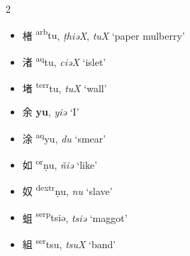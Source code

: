 \begin{multicols}{2}
\begin{minipage}{\columnwidth}
\begin{itemize}[leftmargin=*, labelsep=0.5em]
    \item {\Large{楮}} %
    {\large{{\textsuperscript{arb}tu}}},
    \textit{ṭhiəX}, \textit{tuX} %
    `paper mulberry'

    \item {\Large{渚}} %
    {\large{{\textsuperscript{aq}tu}}},
    \textit{ciəX} %
    `islet'

    \item {\Large{堵}} %
    {\large{{\textsuperscript{terr}tu}}},
    \textit{tuX} %
    `wall'
\end{itemize}
\end{minipage}

\medskip

\begin{itemize}
    \item {\Large{余}} %
    {\large{\textbf{yu}}},
    \textit{yiə} %
    `I'

    \item {\Large{涂}} %
    {\large{{\textsuperscript{aq}yu}}},
    \textit{du} %
    `smear'
\end{itemize}

\vspace{4mm}

\begin{minipage}{\columnwidth}
\begin{itemize}[leftmargin=*, labelsep=0.5em]
    \item {\Large{如}} %
    {\large{{\textsuperscript{or}ṇu}}},
    \textit{ñiə} %
    `like'

    \item {\Large{奴}} %
    {\large{{\textsuperscript{dextr}ṇu}}},
    \textit{nu} %
    `slave'
\end{itemize}
\end{minipage}


\medskip

\begin{itemize}
    \item {\Large{蛆}} %
    {\large{{\textsuperscript{serp}tsiə}}},
    \textit{tsiə} %
    `maggot'

    \item {\Large{組}} %
    {\large{{\textsuperscript{ser}tsu}}},
    \textit{tsuX} %
    `band'
\end{itemize}


\end{multicols}
